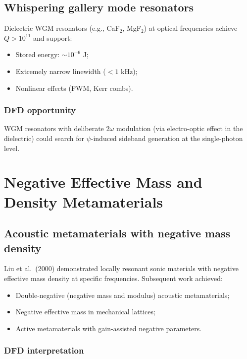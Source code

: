 \documentclass[12pt,letterpaper]{article}
\begin{document}
\subsection{Whispering gallery mode resonators}

Dielectric WGM resonators (e.g., CaF$_2$, MgF$_2$) at optical
frequencies achieve $Q > 10^{11}$ and support:
\begin{itemize}[noitemsep]
  \item Stored energy: $\sim 10^{-6}$ J;
  \item Extremely narrow linewidth ($< 1$ kHz);
  \item Nonlinear effects (FWM, Kerr combs).
\end{itemize}

\subsubsection{DFD opportunity}

WGM resonators with deliberate $2\omega$ modulation (via electro-optic
effect in the dielectric) could search for $\psi$-induced sideband
generation at the single-photon level.

\section{Negative Effective Mass and Density Metamaterials}

\subsection{Acoustic metamaterials with negative mass density}

Liu et al.\ (2000) demonstrated locally resonant sonic materials with
negative effective mass density at specific frequencies.  Subsequent
work achieved:
\begin{itemize}[noitemsep]
  \item Double-negative (negative mass and modulus) acoustic
    metamaterials;
  \item Negative effective mass in mechanical lattices;
  \item Active metamaterials with gain-assisted negative parameters.
\end{itemize}

\subsubsection{DFD interpretation}
\end{document}

